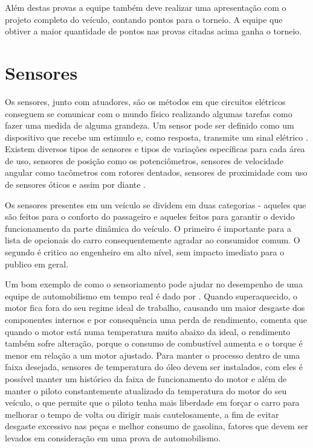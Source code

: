 Além destas provas a equipe também deve realizar uma apresentação com o projeto completo do veículo, contando pontos para o torneio. A equipe que obtiver a maior quantidade de pontos nas provas citadas acima ganha o torneio.

\section{Sensores}
\label{sec:sensores}
Os sensores, junto com atuadores, são os métodos em que circuitos elétricos conseguem se comunicar com o mundo físico realizando algumas tarefas como fazer uma medida de alguma grandeza. Um sensor pode ser definido como um dispositivo que recebe um estimulo e, como resposta, transmite um sinal elétrico \cite{Fraden2016}. Existem diversos tipos de sensores e tipos de variações específicas para cada área de uso, sensores de posição como os potenciômetros, sensores de velocidade angular como tacômetros com rotores dentados, sensores de proximidade com uso de sensores óticos e assim por diante \cite{kilian2001modern}. 

Os sensores presentes em um veículo se dividem em duas categorias \cite{vehicleDataAcquisition2014} - aqueles que são feitos para o conforto do passageiro e aqueles feitos para garantir o devido funcionamento da parte dinâmica do veículo. O primeiro é importante para a lista de opcionais do carro consequentemente agradar ao consumidor comum. O segundo é critico ao engenheiro em alto nível, sem impacto imediato para o publico em geral.

Um bom exemplo de como o sensoriamento pode ajudar no desempenho de uma equipe de automobilismo em tempo real é dado por . Quando superaquecido, o motor fica fora do seu regime ideal de trabalho, causando um maior desgaste dos componentes internos e por consequência uma perda de rendimento,  comenta que quando o motor está numa temperatura muito abaixo da ideal, o rendimento também sofre alteração, porque o consumo de combustível aumenta e o torque é menor em relação a um motor ajustado. Para manter o processo dentro de uma faixa desejada, sensores de temperatura do óleo devem ser instalados, com eles é possível manter um histórico da faixa de funcionamento do motor e além de manter o piloto constantemente atualizado da temperatura do motor do seu veículo, o que permite que o piloto tenha mais liberdade em forçar o carro para melhorar o tempo de volta ou dirigir mais cautelosamente, a fim de evitar desgaste excessivo nas peças e melhor consumo de gasolina, fatores que devem ser levados em consideração em uma prova de automobilismo. 

